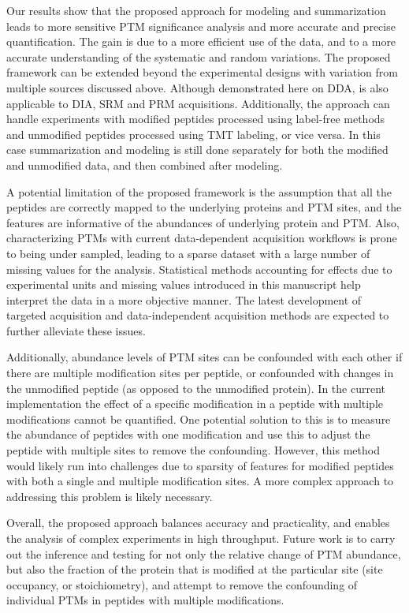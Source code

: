 \documentclass[mcp]{article}
\numberwithin{table}{section}
\begin{document}
Our results show that the proposed approach for modeling and summarization leads to more sensitive PTM significance analysis and more accurate and precise quantification. The gain is due to a more efficient use of the data, and to a more accurate understanding of the systematic and random variations. The proposed framework can be extended beyond the experimental designs with variation from multiple sources discussed above. Although demonstrated here on DDA, is also applicable to DIA, SRM and PRM acquisitions. Additionally, the approach can handle experiments with modified peptides processed using label-free methods and unmodified peptides processed using TMT labeling, or vice versa. In this case summarization and modeling is still done separately for both the modified and unmodified data, and then combined after modeling.

A potential limitation of the proposed framework is the assumption that all the peptides are correctly mapped to the underlying proteins and PTM sites, and the features are informative of the abundances of underlying protein and PTM. Also, characterizing PTMs with current data-dependent acquisition workflows is prone to being under sampled, leading to a sparse dataset with a large number of missing values for the analysis. Statistical methods accounting for effects due to experimental units and missing values introduced in this manuscript help interpret the data in a more objective manner. The latest development of targeted acquisition and data-independent acquisition methods are expected to further alleviate these issues. 

Additionally, abundance levels of PTM sites can be confounded with each other if there are multiple modification sites per peptide, or confounded with changes in the unmodified peptide (as opposed to the unmodified protein). In the current implementation the effect of a specific modification in a peptide with multiple modifications cannot be quantified. One potential solution to this is to measure the abundance of peptides with one modification and use this to adjust the peptide with multiple sites to remove the confounding. However, this method would likely run into challenges due to sparsity of features for modified peptides with both a single and multiple modification sites. A more complex approach to addressing this problem is likely necessary.

Overall, the proposed approach balances accuracy and practicality, and enables the analysis of complex experiments in high throughput. Future work is to carry out the inference and testing for not only the relative change of PTM abundance, but also the fraction of the protein that is modified at the particular site (site occupancy, or stoichiometry), and attempt to remove the confounding of individual PTMs in peptides with multiple modifications.
\end{document}
